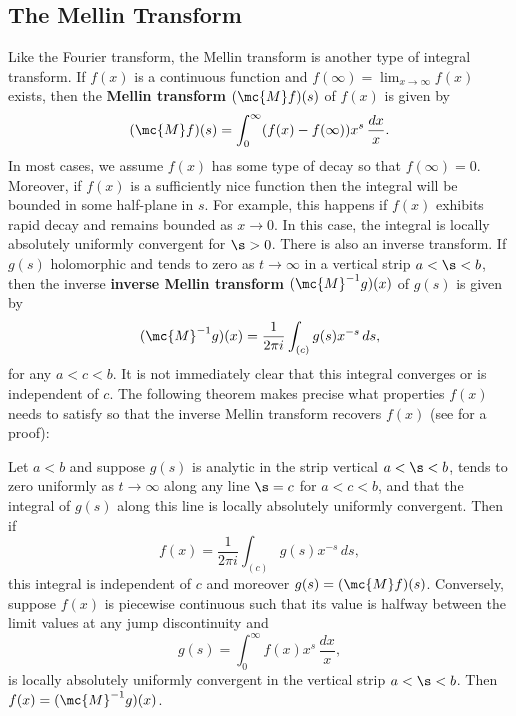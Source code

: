     \subsection*{The Mellin Transform}
      Like the Fourier transform, the Mellin transform is another type of integral transform. If $f(x)$ is a continuous function and $f(\infty) = \lim_{x \to \infty}f(x)$ exists, then the \textbf{Mellin transform} $(\mc{M}f)(s)$ of $f(x)$ is given by
      \[
        (\mc{M}f)(s) = \int_{0}^{\infty}(f(x)-f(\infty))x^{s}\,\frac{dx}{x}.
      \]
      In most cases, we assume $f(x)$ has some type of decay so that $f(\infty) = 0$. Moreover, if $f(x)$ is a sufficiently nice function then the integral will be bounded in some half-plane in $s$. For example, this happens if $f(x)$ exhibits rapid decay and remains bounded as $x \to 0$. In this case, the integral is locally absolutely uniformly convergent for $\s > 0$. There is also an inverse transform. If $g(s)$ holomorphic and tends to zero as $t \to \infty$ in a vertical strip $a < \s < b$, then the inverse \textbf{inverse Mellin transform} $(\mc{M}^{-1}g)(x)$ of $g(s)$ is given by
      \[
        (\mc{M}^{-1}g)(x) = \frac{1}{2\pi i}\int_{(c)}g(s)x^{-s}\,ds,
      \]
      for any $a < c < b$.
      It is not immediately clear that this integral converges or is independent of $c$. The following theorem makes precise what properties $f(x)$ needs to satisfy so that the inverse Mellin transform recovers $f(x)$ (see \cite{debnath2002integral} for a proof):

      \begin{theorem}
        Let $a < b$ and suppose $g(s)$ is analytic in the strip vertical $a < \s < b$, tends to zero uniformly as $t \to \infty$ along any line $\s = c$ for $a < c < b$, and that the integral of $g(s)$ along this line is locally absolutely uniformly convergent. Then if
        \[
          f(x) = \frac{1}{2\pi i}\int_{(c)}g(s)x^{-s}\,ds,
        \]
        this integral is independent of $c$ and moreover $g(s) = (\mc{M}f)(s)$. Conversely, suppose $f(x)$ is piecewise continuous such that its value is halfway between the limit values at any jump discontinuity and
        \[
          g(s) = \int_{0}^{\infty}f(x)x^{s}\,\frac{dx}{x},
        \]
        is locally absolutely uniformly convergent in the vertical strip $a < \s < b$. Then $f(x) = (\mc{M}^{-1}g)(x)$.
      \end{theorem}
